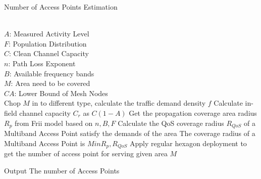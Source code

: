 %
\begin{algorithm}[t]
    \small
\caption{Number of Access Points Estimation}
\label{algorithms:bps}
\begin{algorithmic}[1]
\REQUIRE  ~~\\
	$A$: Measured Activity Level \\
	$F$: Population Distribution\\
	$C$: Clean Channel Capacity\\
	$n$: Path Loss Exponent \\
	$B$: Available frequency bands\\
	$M$: Area need to be covered
\ENSURE ~~\\    
$CA$: Lower Bound of Mesh Nodes\\
\STATE Chop $M$ in to different type, calculate the traffic demand density $f$
\STATE Calculate in-field channel capacity $C_r$ as $C(1-A)$  
\STATE Get the propagation coverage area radius $R_p$ from Frii model based on $n,B,F$
\STATE Calculate the QoS coverage radius $R_{QoS}$ of a Multiband Access Point satisfy the demands of the area
\STATE The coverage radius of a Multiband Access Point is $Min{R_p,R_{QoS}}$
\STATE Apply regular hexagon deployment to get the number of access point for serving given area $M$ 

Output The number of Access Points\\
\end{algorithmic}
\end{algorithm}




